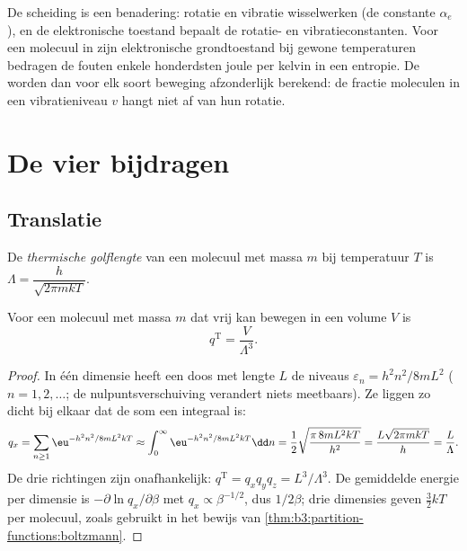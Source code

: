 De scheiding is een benadering: rotatie en vibratie wisselwerken (de
constante $\alpha_e$), en de elektronische toestand bepaalt de rotatie- en
vibratieconstanten. Voor een molecuul in zijn elektronische grondtoestand
bij gewone temperaturen bedragen de fouten enkele honderdsten joule per
kelvin in een entropie. De  worden dan voor elk soort beweging
afzonderlijk berekend: de fractie moleculen in een vibratieniveau $v$
hangt niet af van hun rotatie.

\section{De vier bijdragen}

\subsection*{Translatie}

\begin{definition}\label{def:b3:partition-functions:thermal-wavelength}
De \emph{thermische golflengte} van een
molecuul met massa $m$ bij temperatuur $T$ is
$\Lambda = \dfrac{h}{\sqrt{2\pi mkT}}$.
\end{definition}

\begin{proposition}[Translatietoestandssom]\label{prop:b3:partition-functions:q-trans}
Voor een molecuul met massa $m$ dat vrij kan bewegen in een volume $V$ is
\[
  q^{\mathrm T} = \frac{V}{\Lambda^3}.
\]
\end{proposition}

\begin{proof}
In één dimensie heeft een doos met lengte $L$ de niveaus $\varepsilon_n = h^2n^2/8mL^2$
($n = 1, 2, \dots$; de nulpuntsverschuiving verandert niets meetbaars). Ze
liggen zo dicht bij elkaar dat de som een integraal is:
\[
  q_x = \sum_{n\ge1}\eu^{-h^2n^2/8mL^2kT} \approx \int_0^\infty\eu^{-h^2n^2/8mL^2kT}\dd n
      = \frac12\sqrt{\frac{\pi\,8mL^2kT}{h^2}} = \frac{L\sqrt{2\pi mkT}}{h} = \frac{L}{\Lambda}.
\]
De drie richtingen zijn onafhankelijk: $q^{\mathrm T} = q_xq_yq_z = L^3/\Lambda^3$. De
gemiddelde energie per dimensie is $-\partial\ln q_x/\partial\beta$ met $q_x \propto \beta^{-1/2}$, dus
$1/2\beta$; drie dimensies geven $\frac32kT$ per molecuul, zoals gebruikt in het bewijs van
\cref{thm:b3:partition-functions:boltzmann}.
\end{proof}


